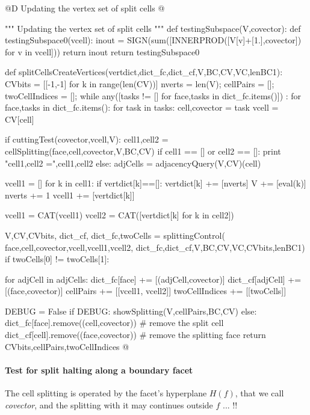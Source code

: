 \documentclass[11pt,oneside]{article}	%
\begin{document}
@D Updating the vertex set  of split cells
@{""" Updating the vertex set of split cells """
def testingSubspace(V,covector):
	def testingSubspace0(vcell):
		inout = SIGN(sum([INNERPROD([V[v]+[1.],covector]) for v in vcell]))
		return inout
	return testingSubspace0

def splitCellsCreateVertices(vertdict,dict_fc,dict_cf,V,BC,CV,VC,lenBC1):
	CVbits = [[-1,-1] for k in range(len(CV))] 
	nverts = len(V); cellPairs = []; twoCellIndices = []; 
	while any([tasks != [] for face,tasks in dict_fc.items()]) : 
		for face,tasks in dict_fc.items():
			for task in tasks:
				cell,covector = task
				vcell = CV[cell]

				if cuttingTest(covector,vcell,V):
					cell1,cell2 = cellSplitting(face,cell,covector,V,BC,CV)
					if cell1 == [] or cell2 == []:
						print "cell1,cell2 =",cell1,cell2
					else:
						adjCells = adjacencyQuery(V,CV)(cell)
												
						vcell1 = []
						for k in cell1:
							if vertdict[k]==[]: 
								vertdict[k] += [nverts]
								V += [eval(k)]
								nverts += 1
							vcell1 += [vertdict[k]]
						
						vcell1 = CAT(vcell1)
						vcell2 = CAT([vertdict[k] for k in cell2])							
															
						V,CV,CVbits, dict_cf, dict_fc,twoCells = splittingControl(
							face,cell,covector,vcell,vcell1,vcell2, dict_fc,dict_cf,V,BC,CV,VC,CVbits,lenBC1)
						if twoCells[0] != twoCells[1]:

							for adjCell in adjCells:
								dict_fc[face] += [(adjCell,covector)] 
								dict_cf[adjCell] += [(face,covector)] 
								cellPairs += [[vcell1, vcell2]]
								twoCellIndices += [[twoCells]]
												
					DEBUG = False
					if DEBUG: showSplitting(V,cellPairs,BC,CV)
				else:
					dict_fc[face].remove((cell,covector))   # remove the split cell
					dict_cf[cell].remove((face,covector))   # remove the splitting face
	return CVbits,cellPairs,twoCellIndices
@}


\paragraph{Test for split halting along a boundary facet}

The cell splitting is operated by the facet's hyperplane $H(f)$, that we call \emph{covector},  and the splitting with it may continues outside $f$ ... !!
\end{document}
